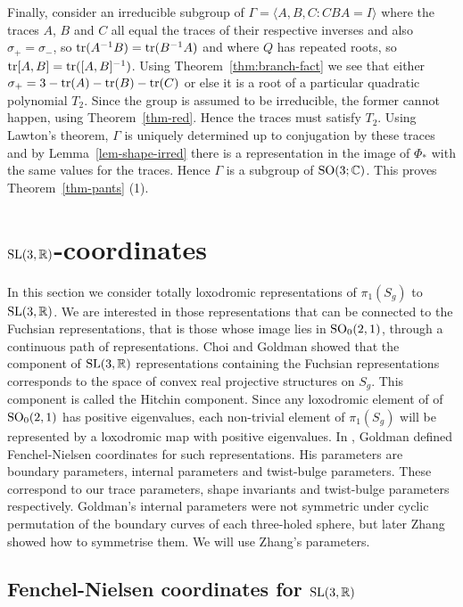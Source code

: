 \documentclass[11pt]{amsart}
\numberwithin{equation}{section}
\begin{document}
Finally, consider an irreducible subgroup of $\Gamma=\langle A,B,C : CBA=I\rangle$ where the traces $A$, $B$ and $C$
all equal the traces of their respective inverses and also $\sigma_+=\sigma_-$, so ${\rm tr}(A^{-1}B)={\rm tr}(B^{-1}A)$
and where $Q$ has repeated roots, so ${\rm tr}[A,B]={\rm tr}([A,B]^{-1})$. Using Theorem~\ref{thm:branch-fact} we see that
either $\sigma_+=3-{\rm tr}(A)-{\rm tr}(B)-{\rm tr}(C)$ or else it is a root of a particular quadratic polynomial 
$T_2$. Since the group is assumed to be irreducible, the former cannot happen, using Theorem~\ref{thm-red}. 
Hence the traces must satisfy $T_2$. Using Lawton's theorem, $\Gamma$ is uniquely determined up to conjugation by 
these traces and by Lemma~\ref{lem-shape-irred} there is a representation in the image of $\Phi_*$ with
the same values for the traces. Hence $\Gamma$ is a subgroup of ${\rm SO}(3;{\mathbb C})$. This proves
Theorem~\ref{thm-pants} (1).


\section{${\rm SL}(3,\mathbb{R})$-coordinates}\label{sec:SL(3,R)}

In this section we consider totally loxodromic representations of $\pi_1(S_g)$ to ${\rm SL}(3,{\mathbb R})$. 
We are interested in those 
representations that can be connected to the Fuchsian representations, that is those whose image lies in
${\rm SO}_0(2,1)$, through a continuous path of
representations. Choi and Goldman \cite{Choi-Gol} showed that the component of ${\rm SL}(3,{\mathbb R})$ 
representations containing the Fuchsian representations corresponds to the space of convex real projective 
structures on $S_g$. This component is called the Hitchin component. Since any loxodromic element of
of ${\rm SO}_0(2,1)$ has positive eigenvalues, each non-trivial element of $\pi_1(S_g)$ will be represented by
a loxodromic map with positive eigenvalues. In \cite{Gol}, Goldman defined Fenchel-Nielsen coordinates
for such representations. His parameters are boundary parameters, internal parameters and twist-bulge parameters.
These correspond to our trace parameters, shape invariants and twist-bulge parameters respectively. Goldman's internal
parameters were not symmetric under cyclic permutation of the boundary curves of each three-holed sphere, but later
Zhang \cite{Zhang2} showed how to symmetrise them. We will use Zhang's parameters. 

\subsection{Fenchel-Nielsen coordinates for ${\rm SL}(3,{\mathbb R})$}
\end{document}
